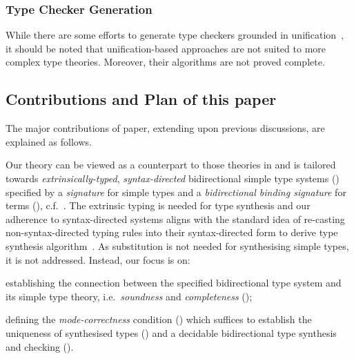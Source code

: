 \subsubsection{Type Checker Generation}
While there are some efforts to generate type checkers grounded in unification~\citep{Gast2004,Grewe2015}, it should be noted that unification-based approaches are not suited to more complex type theories.
Moreover, their algorithms are not proved complete.

\subsection{Contributions and Plan of this paper}
The major contributions of paper, extending upon previous discussions, are explained as follows.

Our theory can be viewed as a counterpart to those theories in  and is tailored towards \emph{extrinsically-typed}, \emph{syntax-directed} bidirectional simple type systems () specified by a \emph{signature} for simple types and a \emph{bidirectional binding signature} for terms (), c.f.\ . 
The extrinsic typing is needed for type synthesis and our adherence to syntax-directed systems aligns with the standard idea of re-casting non-syntax-directed typing rules into their syntax-directed form to derive type synthesis algorithm~\citep{Peyton-Jones2007}.
As substitution is not needed for synthesising simple types, it is not addressed.
Instead, our focus is on:
\begin{enumerate*}
  \item establishing the connection between the specified bidirectional type system and its simple type theory, i.e.\ \emph{soundness} and \emph{completeness} (); 
  \item defining the \emph{mode-correctness} condition () which suffices to establish the uniqueness of synthesised types () and a decidable bidirectional type synthesis and checking ().
\end{enumerate*}

